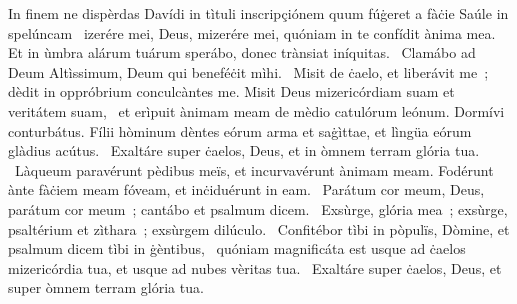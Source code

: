 { In finem ne dispèrdas Davídi in tìtuli inscripçiónem quum fúġeret a fàċie Saúle in spelúncam}
{%
~izerére mei, Deus, mizerére mei, quóniam in te confídit ànima mea. Et in ùmbra alárum tuárum sperábo, donec trànsiat iníquitas. 
~Clamábo ad Deum Altìssimum, Deum qui beneféċit mìhi. 
~Misit de ċaelo, et liberávit me~; dèdit in oppróbrium conculcàntes me. Misit Deus mizericórdiam suam et veritátem suam, 
~et erìpuit ànimam meam de mèdio catulórum leónum. Dormívi conturbátus. Fílii hòminum dèntes eórum arma et saġìttae, et lìngüa eórum glàdius acútus. 
~Exaltáre super ċaelos, Deus, et in òmnem terram glória tua. 
~Làqueum paravérunt pèdibus meïs, et incurvavérunt ànimam meam. Fodérunt ànte fàċiem meam fóveam, et inċiduérunt in eam. 
~Parátum cor meum, Deus, parátum cor meum~; cantábo et psalmum dicem. 
~Exsùrge, glória mea~; exsùrge, psaltérium et zìthara~; exsùrgem dilúculo. 
~Confitébor tìbi in pòpulïs, Dòmine, et psalmum dicem tìbi in ġèntibus, 
~quóniam magnificáta est usque ad ċaelos mizericórdia tua, et usque ad nubes vèritas tua. 
~Exaltáre super ċaelos, Deus, et super òmnem terram glória tua. 
}
